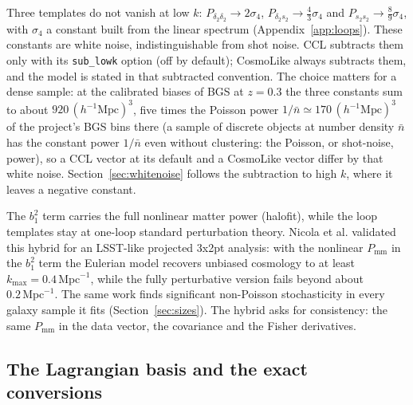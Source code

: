 \documentclass[11pt]{article}
\newcommand{\bone}{b_1}            %
\newcommand{\pnl}{P_{\mathrm{mm}}}
\newcommand{\kmax}{k_{\mathrm{max}}}
\begin{document}
Three templates do not vanish at low $k$:
$P_{\delta_2\delta_2} \to 2\sigma_4$,
$P_{\delta_2 s_2} \to \tfrac{4}{3}\sigma_4$ and
$P_{s_2 s_2} \to \tfrac{8}{9}\sigma_4$, with $\sigma_4$ a constant
built from the linear spectrum (Appendix~\ref{app:loops}).  These
constants are white noise, indistinguishable from shot noise.  CCL
subtracts them only with its \texttt{sub\_lowk} option (off by
default); CosmoLike always subtracts them, and the model is stated in
that subtracted convention.  The choice matters for a dense sample: at
the calibrated biases of BGS at $z = 0.3$ the three constants sum to
about $920\,(h^{-1}\mathrm{Mpc})^3$, five times the Poisson power
$1/\bar{n} \simeq 170\,(h^{-1}\mathrm{Mpc})^3$ of the project's BGS
bins there (a sample of discrete objects at number density $\bar{n}$
has the constant power $1/\bar{n}$ even without clustering: the
Poisson, or shot-noise, power), so a CCL vector at its default and a
CosmoLike vector
differ by that white noise.  Section~\ref{sec:whitenoise} follows the
subtraction to high $k$, where it leaves a negative constant.

The $\bone^2$ term carries the full nonlinear matter power (halofit),
while the loop templates stay at one-loop standard perturbation theory.
Nicola et al. \cite{Nicola2023} validated this hybrid for an LSST-like
projected 3x2pt analysis: with the nonlinear $\pnl$ in the $\bone^2$
term the Eulerian model recovers unbiased cosmology to at least
$\kmax = 0.4\,\mathrm{Mpc}^{-1}$, while the fully perturbative version
fails beyond about $0.2\,\mathrm{Mpc}^{-1}$.  The same work finds
significant non-Poisson stochasticity in every galaxy sample it fits
(Section~\ref{sec:sizes}).  The hybrid asks for consistency: the same
$\pnl$ in the data vector, the covariance and the Fisher derivatives.

\subsection{The Lagrangian basis and the exact conversions}
\label{sec:lagrangian}
\end{document}
